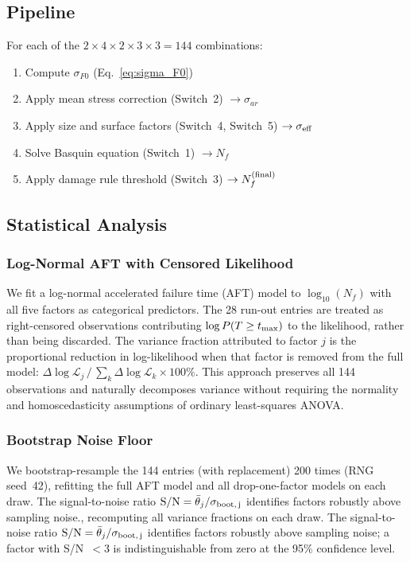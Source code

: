 \documentclass[12pt,a4paper]{article}
\begin{document}
\subsection{Pipeline}

For each of the $2\times4\times2\times3\times3 = 144$ combinations:
\begin{enumerate}
  \item Compute $\sigma_{F0}$ (Eq.~\ref{eq:sigma_F0})
  \item Apply mean stress correction (Switch~2) $\rightarrow \sigma_{ar}$
  \item Apply size and surface factors (Switch~4, Switch~5)
        $\rightarrow \sigma_{\rm eff}$
  \item Solve Basquin equation (Switch~1) $\rightarrow N_f$
  \item Apply damage rule threshold (Switch~3)
        $\rightarrow N_f^{\rm (final)}$
\end{enumerate}

\subsection{Statistical Analysis}

\subsubsection{Log-Normal AFT with Censored Likelihood}

We fit a log-normal accelerated failure time (AFT) model to
$\log_{10}(N_f)$ with all five factors as categorical predictors.
The 28 run-out entries are treated as right-censored observations
contributing $\log P(T \geq t_{\rm max})$ to the likelihood, rather
than being discarded. The variance fraction attributed to factor
$j$ is the proportional reduction in log-likelihood when that factor
is removed from the full model: $\Delta\log\mathcal{L}_j\,/\,
\sum_k \Delta\log\mathcal{L}_k \times 100\%$. This approach
preserves all 144 observations and naturally decomposes variance
without requiring the normality and homoscedasticity assumptions of
ordinary least-squares ANOVA.

\subsubsection{Bootstrap Noise Floor}

We bootstrap-resample the 144 entries (with replacement) 200 times
(RNG seed~42), refitting the full AFT model and all drop-one-factor
models on each draw. The signal-to-noise ratio
$\mathrm{S/N} = \bar{\theta}_j / \sigma_{\rm boot,\,j}$ identifies
factors robustly above sampling noise., recomputing all variance fractions on each draw. The
signal-to-noise ratio $\mathrm{S/N} = \bar{\theta}_j /
\sigma_{\rm boot,\,j}$ identifies factors robustly above sampling noise;
a factor with S/N~$<3$ is indistinguishable from zero at the 95\%
confidence level.
\end{document}
